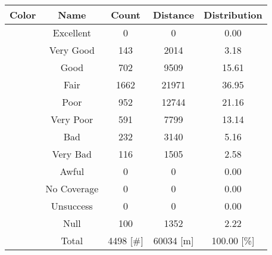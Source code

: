 \begin{tabular}{|c|c|c|c|c|}\hline
\rowcolor{Plum!20}
Color&Name&Count&Distance&Distribution\\\hline\hline
\cellcolor[HTML]{00703c} &Excellent&0&0&0.00\\\hline
\cellcolor[HTML]{00a032} &Very Good&143&2014&3.18\\\hline
\cellcolor[HTML]{00d228} &Good&702&9509&15.61\\\hline
\cellcolor[HTML]{ffff00} &Fair&1662&21971&36.95\\\hline
\cellcolor[HTML]{ffaa00} &Poor&952&12744&21.16\\\hline
\cellcolor[HTML]{fa6400} &Very Poor&591&7799&13.14\\\hline
\cellcolor[HTML]{ff0000} &Bad&232&3140&5.16\\\hline
\cellcolor[HTML]{dc143c} &Very Bad&116&1505&2.58\\\hline
\cellcolor[HTML]{820000} &Awful&0&0&0.00\\\hline
\cellcolor[HTML]{aaaaaa} &No Coverage&0&0&0.00\\\hline
\cellcolor[HTML]{1e90ff} &Unsuccess&0&0&0.00\\\hline
\cellcolor[HTML]{000000} &Null&100&1352&2.22\\\hline
\cellcolor[HTML]{ffffff} &Total&4498 [\#]&60034 [m]&100.00 [\%]\\\hline
\end{tabular}
